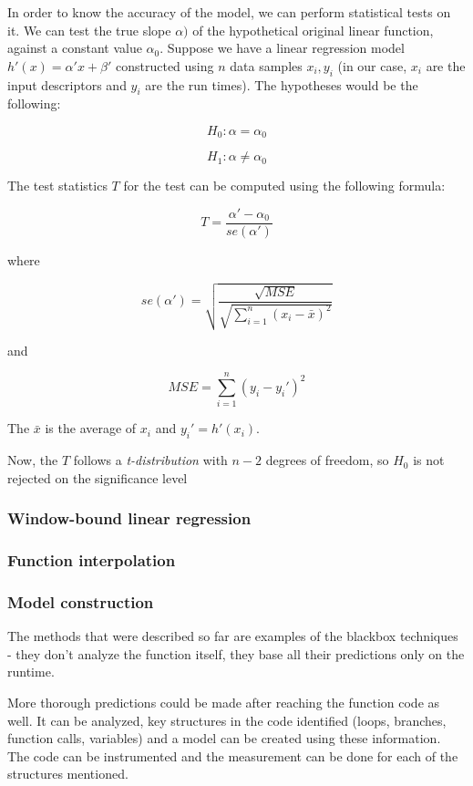 In order to know the accuracy of the model, we can perform statistical tests on it. We can test the true slope \(\alpha)\) of the hypothetical original linear function, against a constant value \(\alpha_0\). Suppose we have a linear regression model \(h'(x) = \alpha' x + \beta'\) constructed using \(n\) data samples \(x_i, y_i\) (in our case, \(x_i\) are the input descriptors and \(y_i\) are the run times). The hypotheses would be the following:

\[H_0: \alpha = \alpha_0 \]

\[H_1: \alpha \neq \alpha_0 \]

The test statistics \(T\) for the test can be computed using the following formula:

\[T = \frac{\alpha' - \alpha_0}{se(\alpha')}\]

where

\[se(\alpha') = \sqrt{\frac{\sqrt{MSE}}{ \sqrt{ \sum_{i = 1}^{n} (x_i - \bar{x})^2 }}} \]

and

\[MSE = { \sum_{i = 1}^{n} (y_i - y_i')^2 }\]

The \(\bar{x}\) is the average of \(x_i\) and \(y_i' = h'(x_i)\).

Now, the \(T\) follows a \textit{t-distribution} with \(n-2\) degrees of freedom, so \(H_0\) is not rejected on the significance level

\subsubsection{Window-bound linear regression}

\subsubsection{Function interpolation}

\subsubsection{Model construction}

The methods that were described so far are examples of the blackbox techniques - they don't analyze the function itself, they base all their predictions only on the runtime.

More thorough predictions could be made after reaching the function code as well. It can be analyzed, key structures in the code identified (loops, branches, function calls, variables) and a model can be created using these information. The code can be instrumented and the measurement can be done for each of the structures mentioned. 

